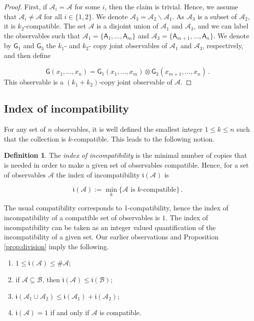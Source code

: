 \documentclass[12pt]{amsart}
\theoremstyle{definition}
\newtheorem{definition}{Definition}
\newcommand{\ind}[1]{\mathfrak{i}(#1)}
\newcommand{\A}{\mathsf{A}}%
\newcommand{\G}{\mathsf{G}}%
\begin{document}
\begin{proof}
First, if $\mathcal{A}_i=\mathcal{A}$ for some $i$, then the claim is trivial.
Hence, we assume that $\mathcal{A}_i \neq \mathcal{A}$ for all $i\in\{1,2\}$.
We denote $\mathcal{A}_3=\mathcal{A}_2\smallsetminus \mathcal{A}_1$.
As $\mathcal{A}_3$ is a subset of $\mathcal{A}_2$, it is $k_2$-compatible.
The set $\mathcal{A}$ is a disjoint union of $\mathcal{A}_1$ and $\mathcal{A}_3$, and we can label the observables such that $\mathcal{A}_1=\{\A_1,\ldots,\A_m\}$ and $\mathcal{A}_3=\{\A_{m+1},\ldots,\A_n\}$.
We denote by $\G_1$ and $\G_3$ the $k_1$- and $k_2$- copy joint observables of $\mathcal{A}_1$ and $\mathcal{A}_3$, respectively, and then define

\begin{equation*}
\G(x_1,\ldots,x_n) = \G_1(x_1,\ldots,x_m) \otimes \G_3(x_{m+1},\ldots,x_n) \, .
\end{equation*}
This observable is a $(k_1+k_2)$-copy joint observable of $\mathcal{A}$.
\end{proof}

\subsection{Index of incompatibility}\label{sec:index}


For any set of $n$ observables, it is well defined  the smallest integer $1\leq k \leq n$ such that the collection is $k$-compatible.
This leads to the following notion.

\begin{definition}
\label{def:indexofinc}
The \emph{index of incompatibility} is the minimal number of copies that is needed in order to make a given set of observables compatible.
Hence, for a set of observables $\mathcal{A}$ the index of incompatibility $\ind{\mathcal{A}}$ is

\begin{equation*}
\ind{\mathcal{A}} := \min_k \{ \textrm{$\mathcal{A}$ is $k$-compatible} \} \, .
\end{equation*}
\end{definition}

The usual compatibility corresponds to 1-compatibility, hence the index of incompatibility of a compatible set of observables is $1$.
The index of incompatibility can be taken as an integer valued quantification of the incompatibility of a given set. 
Our earlier observations and Proposition \ref{prop:division} imply the following.
\begin{enumerate}[leftmargin=*,labelsep=3mm,label=(\roman*)]
\item $1 \leq \ind{\mathcal{A}} \leq \#\mathcal{A}$;
\item if $\mathcal{A}\subseteq\mathcal{B}$, then  $\ind{\mathcal{A}} \leq \ind{\mathcal{B}}$;
\item $\ind{\mathcal{A}_1 \cup \mathcal{A}_2} \leq \ind{\mathcal{A}_1} + \ind{\mathcal{A}_2}$;
\item $\ind{\mathcal{A}}=1$ if and only if $\mathcal{A}$ is compatible.
\end{enumerate}
\end{document}

